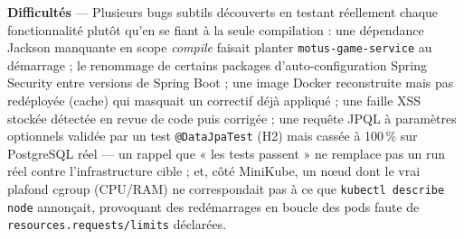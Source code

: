 \documentclass[a4paper,11pt]{article}
\begin{document}
\textbf{Difficult\'es} --- Plusieurs bugs subtils d\'ecouverts en testant r\'eellement chaque fonctionnalit\'e plut\^ot qu'en se fiant \`a la seule compilation : une d\'ependance Jackson manquante en scope \emph{compile} faisait planter \texttt{motus-game-service} au d\'emarrage ; le renommage de certains packages d'auto-configuration Spring Security entre versions de Spring Boot ; une image Docker reconstruite mais pas red\'eploy\'ee (cache) qui masquait un correctif d\'ej\`a appliqu\'e ; une faille XSS stock\'ee d\'etect\'ee en revue de code puis corrig\'ee ; une requ\^ete JPQL \`a param\`etres optionnels valid\'ee par un test \texttt{@DataJpaTest} (H2) mais cass\'ee \`a 100\,\% sur PostgreSQL r\'eel --- un rappel que « les tests passent » ne remplace pas un run r\'eel contre l'infrastructure cible ; et, c\^ot\'e MiniKube, un n\oe{}ud dont le vrai plafond cgroup (CPU/RAM) ne correspondait pas \`a ce que \texttt{kubectl describe node} annon\c{c}ait, provoquant des red\'emarrages en boucle des pods faute de \texttt{resources.requests/limits} d\'eclar\'ees.
\end{document}
